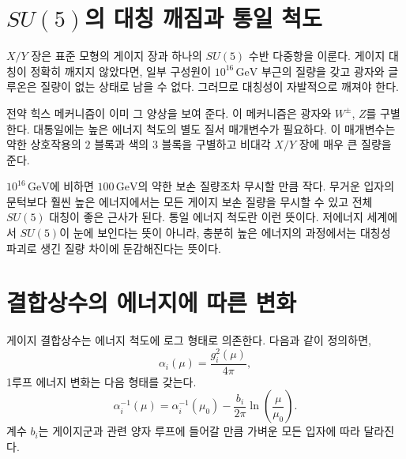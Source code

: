\section{\texorpdfstring{\(SU(5)\)}{5}의 대칭 깨짐과 통일 척도}

\(X/Y\) 장은 표준 모형의 게이지 장과 하나의 \(SU(5)\) 수반 다중항을 이룬다. 게이지 대칭이 정확히 깨지지 않았다면, 일부 구성원이 \(10^{16}\,\mathrm{GeV}\) 부근의 질량을 갖고 광자와 글루온은 질량이 없는 상태로 남을 수 없다. 그러므로 대칭성이 자발적으로 깨져야 한다.

\begin{classroomqa}
\end{classroomqa}

전약 힉스 메커니즘이 이미 그 양상을 보여 준다. 이 메커니즘은 광자와 \(W^\pm\), \(Z\)를 구별한다. 대통일에는 높은 에너지 척도의 별도 질서 매개변수가 필요하다. 이 매개변수는 약한 상호작용의 \(2\) 블록과 색의 \(3\) 블록을 구별하고 비대각 \(X/Y\) 장에 매우 큰 질량을 준다.

\(10^{16}\,\mathrm{GeV}\)에 비하면 \(100\,\mathrm{GeV}\)의 약한 보손 질량조차 무시할 만큼 작다. 무거운 입자의 문턱보다 훨씬 높은 에너지에서는 모든 게이지 보손 질량을 무시할 수 있고 전체 \(SU(5)\) 대칭이 좋은 근사가 된다. 통일 에너지 척도란 이런 뜻이다. 저에너지 세계에서 \(SU(5)\)이 눈에 보인다는 뜻이 아니라, 충분히 높은 에너지의 과정에서는 대칭성 파괴로 생긴 질량 차이에 둔감해진다는 뜻이다.

\section{결합상수의 에너지에 따른 변화}

게이지 결합상수는 에너지 척도에 로그 형태로 의존한다. 다음과 같이 정의하면,
\begin{equation}
\alpha_i(\mu)=\frac{g_i^2(\mu)}{4\pi},
\end{equation}
1루프 에너지 변화는 다음 형태를 갖는다.
\begin{equation}
\alpha_i^{-1}(\mu)
=
\alpha_i^{-1}(\mu_0)
-\frac{b_i}{2\pi}
\ln\!\left(\frac{\mu}{\mu_0}\right).
\label{eq:l10-running}
\end{equation}
계수 \(b_i\)는 게이지군과 관련 양자 루프에 들어갈 만큼 가벼운 모든 입자에 따라 달라진다.

